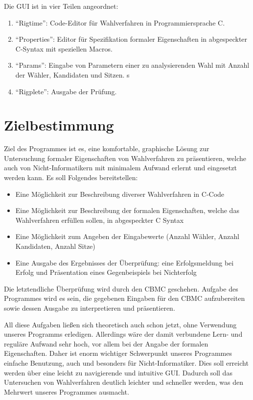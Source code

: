 \documentclass[a4paper]{scrreprt}
\begin{document}
Die \ac{GUI} ist in vier Teilen angeordnet:
\begin{enumerate}
\item "`Rigtime"': Code-Editor für Wahlverfahren in Programmiersprache C.
\item "`Properties"': Editor für Spezifikation formaler Eigenschaften in abgespeckter C-Syntax mit speziellen Macros.
\item "`Params"': Eingabe von Parametern einer zu analysierenden Wahl mit Anzahl der Wähler, Kandidaten und Sitzen. s
\item "`Rigplete"': Ausgabe der Prüfung.
\end{enumerate}

\chapter{Zielbestimmung}
Ziel des Programmes ist es, eine komfortable, graphische Lösung zur Untersuchung formaler Eigenschaften von Wahlverfahren zu präsentieren, welche auch von Nicht-Informatikern mit minimalem Aufwand erlernt und eingesetzt werden kann. 
Es soll Folgendes bereitstellen:
\begin{itemize}
\item Eine Möglichkeit zur Beschreibung diverser Wahlverfahren in C-Code  
\item Eine Möglichkeit zur Beschreibung der formalen Eigenschaften, welche das Wahlverfahren erfüllen sollen, in abgespeckter C Syntax 
\item Eine Möglichkeit zum Angeben der Eingabewerte (Anzahl Wähler, Anzahl Kandidaten, Anzahl Sitze) 
\item Eine Ausgabe des Ergebnisses der Überprüfung: eine Erfolgsmeldung bei Erfolg und Präsentation eines Gegenbeispiels bei Nichterfolg
\end{itemize}

Die letztendliche Überprüfung wird durch den \ac{CBMC} geschehen. Aufgabe des Programmes wird es sein, die gegebenen Eingaben für den \ac{CBMC} aufzubereiten sowie dessen Ausgabe zu interpretieren und präsentieren. 

All diese Aufgaben ließen sich theoretisch auch schon jetzt, ohne Verwendung unseres Programms erledigen. Allerdings wäre der damit verbundene Lern- und reguläre Aufwand sehr hoch, vor allem bei der Angabe der formalen Eigenschaften. Daher ist enorm wichtiger Schwerpunkt unseres Programmes einfache Benutzung, auch und besonders für Nicht-Informatiker. Dies soll erreicht werden über eine leicht zu navigierende und intuitive \ac{GUI}. Dadurch soll das Untersuchen von Wahlverfahren deutlich leichter und schneller werden, was den Mehrwert unseres Programmes ausmacht.
\end{document}
